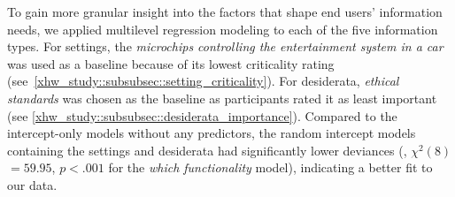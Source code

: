 To gain more granular insight into the factors that shape end users' information needs, we applied multilevel regression modeling to each of the five information types.
For settings, the \textit{microchips controlling the entertainment system in a car} was used as a baseline because of its lowest criticality rating (see~\autoref{xhw_study::subsubsec::setting_criticality}).
For desiderata, \textit{ethical standards} was chosen as the baseline as participants rated it as least important (see \autoref{xhw_study::subsubsec::desiderata_importance}).
Compared to the intercept-only models without any predictors, the random intercept models containing the settings and desiderata had significantly lower deviances (\eg, $\chi^2(8)$$=$$59.95$, $p$$<$$.001$ for the \textit{which functionality} model), indicating a better fit to our data.

